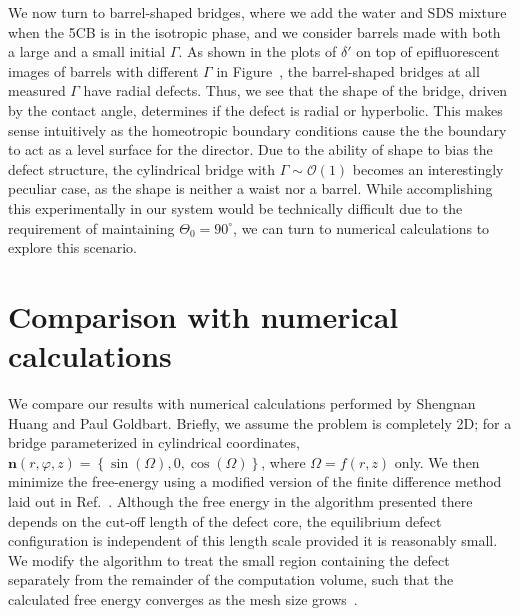 We now turn to barrel-shaped bridges, where we add the water and SDS mixture when the 5CB is in the isotropic phase, and we consider barrels made with both a large and a small initial $\Gamma$.
As shown in the plots of $\delta'$ on top of epifluorescent images of barrels with different $\Gamma$ in Figure~, the barrel-shaped bridges at all measured $\Gamma$ have radial defects.
Thus, we see that the shape of the bridge, driven by the contact angle, determines if the defect is radial or hyperbolic.
This makes sense intuitively as the homeotropic boundary conditions cause the the boundary to act as a level surface for the director.
Due to the ability of shape to bias the defect structure, the cylindrical bridge with $\Gamma \sim \mathcal{O}\left (1 \right )$ becomes an interestingly peculiar case, as the shape is neither a waist nor a barrel.
While accomplishing this experimentally in our system would be technically difficult due to the requirement of maintaining $\Theta_0 = 90^{\circ}$, we can turn to numerical calculations to explore this scenario.




\section{Comparison with numerical calculations}
We compare our results with numerical calculations performed by Shengnan Huang and Paul Goldbart.
Briefly, we assume the problem is completely 2D; for a bridge parameterized in cylindrical coordinates, $\mathbf{n}(r,\varphi,z) = \left \{ \sin(\Omega), 0, \cos(\Omega)   \right \}$, where $\Omega = f(r,z)$ only.
We then minimize the free-energy using a modified version of the finite difference method laid out in Ref.~\cite{RN144}.
Although the free energy in the algorithm presented there depends on the cut-off length of the defect core, the equilibrium defect configuration is independent of this length scale provided it is reasonably small.
We modify the algorithm to treat the small region containing the defect separately from the remainder of the computation volume, such that the calculated free energy converges as the mesh size grows~\cite{RN199,RN200,RN201}.

